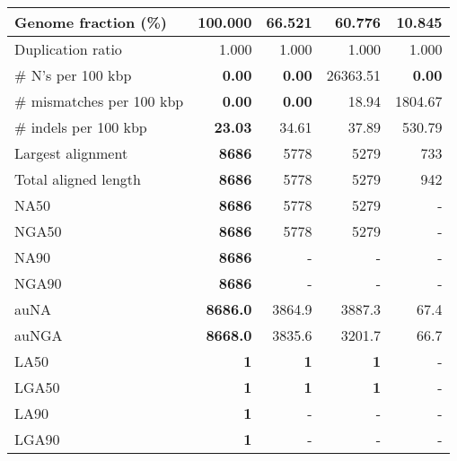 \documentclass[12pt,a4paper]{article}
\begin{document}
\begin{table}[ht]
\begin{center}
\begin{tabular}{|l*{4}{|r}|}
Genome fraction (\%) & {\bf 100.000} & 66.521 & 60.776 & 10.845 \\ \hline
Duplication ratio & 1.000 & 1.000 & 1.000 & 1.000 \\ \hline
\# N's per 100 kbp & {\bf 0.00} & {\bf 0.00} & 26363.51 & {\bf 0.00} \\ \hline
\# mismatches per 100 kbp & {\bf 0.00} & {\bf 0.00} & 18.94 & 1804.67 \\ \hline
\# indels per 100 kbp & {\bf 23.03} & 34.61 & 37.89 & 530.79 \\ \hline
Largest alignment & {\bf 8686} & 5778 & 5279 & 733 \\ \hline
Total aligned length & {\bf 8686} & 5778 & 5279 & 942 \\ \hline
NA50 & {\bf 8686} & 5778 & 5279 & - \\ \hline
NGA50 & {\bf 8686} & 5778 & 5279 & - \\ \hline
NA90 & {\bf 8686} & - & - & - \\ \hline
NGA90 & {\bf 8686} & - & - & - \\ \hline
auNA & {\bf 8686.0} & 3864.9 & 3887.3 & 67.4 \\ \hline
auNGA & {\bf 8668.0} & 3835.6 & 3201.7 & 66.7 \\ \hline
LA50 & {\bf 1} & {\bf 1} & {\bf 1} & - \\ \hline
LGA50 & {\bf 1} & {\bf 1} & {\bf 1} & - \\ \hline
LA90 & {\bf 1} & - & - & - \\ \hline
LGA90 & {\bf 1} & - & - & - \\ \hline
\end{tabular}
\end{center}
\end{table}
\end{document}
